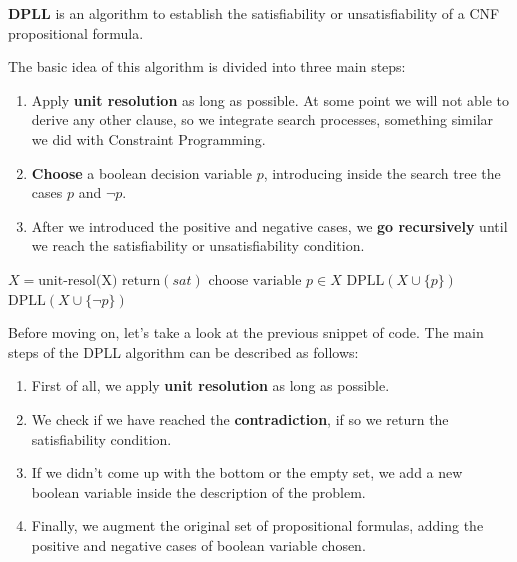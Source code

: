 \textbf{DPLL} is an algorithm to establish the satisfiability or unsatisfiability of a CNF propositional formula. \vspace{7pt}

The basic idea of this algorithm is divided into three main steps:
\begin{enumerate}
    \item Apply \textbf{unit resolution} as long as possible. At some point we will not able to derive any other clause, so we integrate search processes, something similar we did with Constraint Programming.
    \item \textbf{Choose} a boolean decision variable $p$, introducing inside the search tree the cases $p$ and $\neg p$.
    \item After we introduced the positive and negative cases, we \textbf{go recursively} until we reach the satisfiability or unsatisfiability condition.
\end{enumerate}
\begin{definition}[title = DPLL pseudocode]
    \begin{algorithmic}
            \State $X = \text{unit-resol(X)}$
                \State $\text{return}(\textit{sat})$
            \EndIf
                \State $\text{choose variable } p \in X$
                \State $\text{DPLL}(X \cup \{p\})$
                \State $\text{DPLL}(X \cup \{\neg p\})$
            \EndIf
        \EndProcedure
    \end{algorithmic}

    Before moving on, let's take a look at the previous snippet of code. The main steps of the DPLL algorithm can be described as follows:
    \begin{enumerate}
        \item First of all, we apply \textbf{unit resolution} as long as possible.
        \item We check if we have reached the \textbf{contradiction}, if so we return the satisfiability condition.
        \item If we didn't come up with the bottom or the empty set, we add a new boolean variable inside the description of the problem.
        \item Finally, we augment the original set of propositional formulas, adding the positive and negative cases of boolean variable chosen.
    \end{enumerate}
\end{definition}
